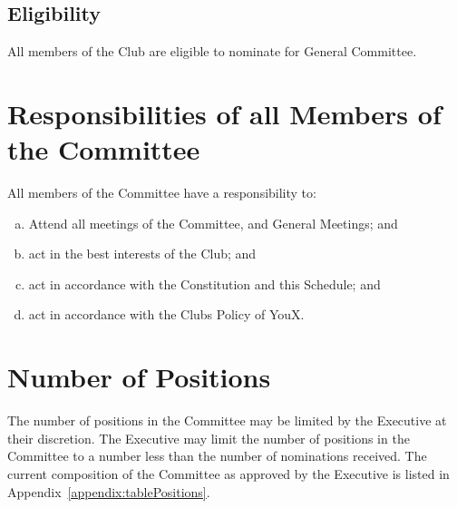 \documentclass[11pt]{report}
\begin{document}
\subsection{Eligibility}
All members of the Club are eligible to nominate for General Committee.

\section{Responsibilities of all Members of the Committee}
All members of the Committee have a responsibility to:
\begin{enumerate}[(a)]
    \item Attend all meetings of the Committee, and General Meetings; and
    \item act in the best interests of the Club; and
    \item act in accordance with the Constitution and this Schedule; and
    \item act in accordance with the Clubs Policy of YouX.
\end{enumerate}

\section{Number of Positions}
The number of positions in the Committee may be limited by the Executive at their discretion. The Executive may limit the number of positions in the Committee to a number less than the number of nominations received. The current composition of the Committee as approved by the Executive is listed in Appendix~\ref{appendix:tablePositions}.

\appendix 
\end{document}
